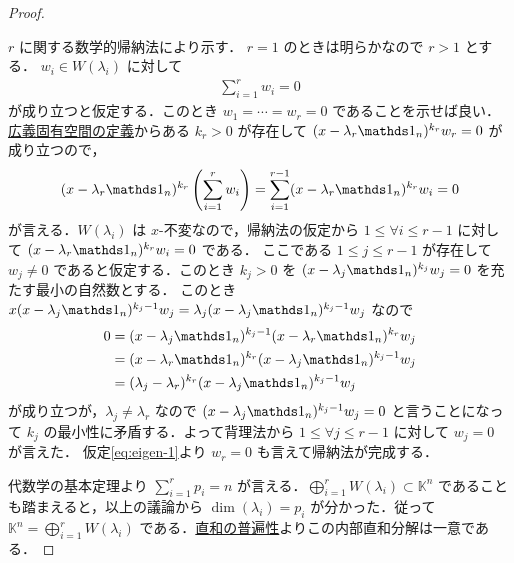 \documentclass[rep_main]{subfiles}
\begin{document}
\begin{proof}
\begin{description}
        $r$ に関する数学的帰納法により示す．
        $r = 1$ のときは明らかなので $r > 1$ とする．
        $w_i \in W(\lambda_i)$ に対して
        \begin{align}
            \label{eq:eigen-1}
            \sum_{i=1}^r w_i = 0
        \end{align}
        が成り立つと仮定する．このとき $w_1 = \cdots = w_r = 0$ であることを示せば良い．
        \hyperref[def:eigen]{広義固有空間の定義}からある $k_r > 0$ が存在して $(x - \lambda_r \unity_n)^{k_r} w_r = 0$ が成り立つので，
        \begin{align}
            (x - \lambda_r \unity_n)^{k_r}\left(\sum_{i=1}^rw_i \right) = \sum_{i=1}^{r-1} (x - \lambda_r \unity_n)^{k_r}w_i = 0
        \end{align}
        が言える．$W(\lambda_i)$ は $x$-不変なので，帰納法の仮定から $1 \le \forall i \le r-1$ に対して $(x - \lambda_r \unity_n)^{k_r}w_i = 0$ である．
        ここである $1 \le j \le r-1$ が存在して $w_j \neq 0$ であると仮定する．このとき $k_j > 0$ を $(x - \lambda_j \unity_n)^{k_j} w_j = 0$ を充たす最小の自然数とする．
        このとき $x (x - \lambda_j \unity_n)^{k_j-1} w_j = \lambda_j (x - \lambda_j \unity_n)^{k_j-1} w_j$ なので
        \begin{align}
            0 
            &= (x - \lambda_j \unity_n)^{k_j-1} (x - \lambda_r \unity_n)^{k_r}w_j \\
            &= (x - \lambda_r \unity_n)^{k_r}(x - \lambda_j \unity_n)^{k_j-1} w_j \\
            &= (\lambda_j - \lambda_r)^{k_r}(x - \lambda_j \unity_n)^{k_j-1} w_j
        \end{align}
        が成り立つが，$\lambda_j \neq \lambda_r$ なので $(x - \lambda_j \unity_n)^{k_j-1} w_j = 0$ と言うことになって $k_j$ の最小性に矛盾する．よって背理法から $1 \le \forall j \le r-1$ に対して $w_j = 0$ が言えた．
        仮定\eqref{eq:eigen-1}より $w_r = 0$ も言えて帰納法が完成する．
    \end{description}

    代数学の基本定理より $\sum_{i=1}^r p_i = n$ が言える．$\bigoplus_{i=1}^r W(\lambda_i) \subset \mathbb{K}^n$ であることも踏まえると，以上の議論から $\dim (\lambda_i) = p_i$ が分かった．従って $\mathbb{K}^n = \bigoplus_{i=1}^r W(\lambda_i)$ である．\hyperref[def:univ-vec-sum]{直和の普遍性}よりこの内部直和分解は一意である．
\end{proof}
\end{document}
